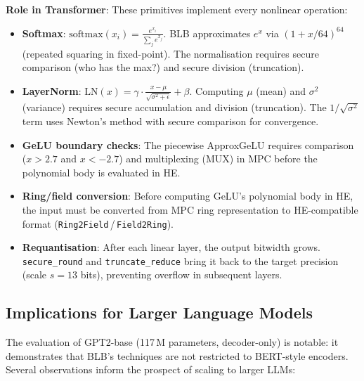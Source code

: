 \textbf{Role in Transformer}: These primitives implement every nonlinear operation:
\begin{itemize}[nosep]
  \item \textbf{Softmax}: $\text{softmax}(x_i) = \frac{e^{x_i}}{\sum_j e^{x_j}}$.
        BLB approximates $e^x$ via $(1 + x/64)^{64}$ (repeated squaring in fixed-point).
        The normalisation requires secure comparison (who has the max?) and secure division (truncation).
  \item \textbf{LayerNorm}: $\text{LN}(x) = \gamma \cdot \frac{x - \mu}{\sqrt{\sigma^2 + \epsilon}} + \beta$.
        Computing $\mu$ (mean) and $\sigma^2$ (variance) requires secure accumulation and division (truncation).
        The $1/\sqrt{\sigma^2}$ term uses Newton's method with secure comparison for convergence.
  \item \textbf{GeLU boundary checks}: The piecewise ApproxGeLU requires comparison ($x > 2.7$ and $x < -2.7$) and multiplexing (MUX) in MPC before the polynomial body is evaluated in HE.
  \item \textbf{Ring/field conversion}: Before computing GeLU's polynomial body in HE, the input must be converted from MPC ring representation to HE-compatible format (\texttt{Ring2Field}\,/\,\texttt{Field2Ring}).
  \item \textbf{Requantisation}: After each linear layer, the output bitwidth grows. \texttt{secure\_round} and \texttt{truncate\_reduce} bring it back to the target precision (scale $s{=}13$ bits), preventing overflow in subsequent layers.
\end{itemize}

\subsection{Implications for Larger Language Models}\label{ssec:llm-scaling}

The evaluation of GPT2-base (117\,M parameters, decoder-only) is notable: it demonstrates that BLB's techniques are not restricted to BERT-style encoders.
Several observations inform the prospect of scaling to larger LLMs:


